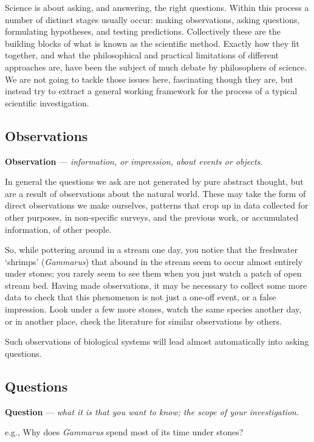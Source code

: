 \documentclass[]{book}
\begin{document}
Science is about asking, and answering, the right questions. Within this
process a number of distinct stages usually occur: making observations,
asking questions, formulating hypotheses, and testing predictions.
Collectively these are the building blocks of what is known as the
scientific method. Exactly how they fit together, and what the
philosophical and practical limitations of different approaches are,
have been the subject of much debate by philosophers of science. We are
not going to tackle those issues here, fascinating though they are, but
instead try to extract a general working framework for the process of a
typical scientific investigation.

\subsection{Observations}\label{stages-observations}

\textbf{Observation} --- \emph{information, or impression, about events
or objects}.

In general the questions we ask are not generated by pure abstract
thought, but are a result of observations about the natural world. These
may take the form of direct observations we make ourselves, patterns
that crop up in data collected for other purposes, in non-specific
surveys, and the previous work, or accumulated information, of other
people.

So, while pottering around in a stream one day, you notice that the
freshwater `shrimps' (\emph{Gammarus}) that abound in the stream seem to
occur almost entirely under stones; you rarely seem to see them when you
just watch a patch of open stream bed. Having made observations, it may
be necessary to collect some more data to check that this phenomenon is
not just a one-off event, or a false impression. Look under a few more
stones, watch the same species another day, or in another place, check
the literature for similar observations by others.

Such observations of biological systems will lead almost automatically
into asking questions.

\subsection{Questions}\label{stages-questions}

\textbf{Question} --- \emph{what it is that you want to know; the scope
of your investigation}.

e.g., Why does \emph{Gammarus} spend most of its time under stones?
\end{document}
